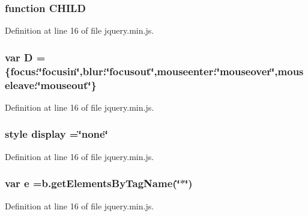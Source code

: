 \subsubsection[{C\-H\-I\-L\-D}]{\setlength{\rightskip}{0pt plus 5cm}function C\-H\-I\-L\-D}\label{jquery_8min_8js_a8f393b37f425a3fbb3a99911c237f50f}


Definition at line 16 of file jquery.\-min.\-js.

\subsubsection[{D}]{\setlength{\rightskip}{0pt plus 5cm}var D =\{focus\-:\char`\"{}focusin\char`\"{},blur\-:\char`\"{}focusout\char`\"{},mouseenter\-:\char`\"{}mouseover\char`\"{},mouseleave\-:\char`\"{}mouseout\char`\"{}\}}\label{jquery_8min_8js_ad741d7cd7e6eda75030b55e36b706c0a}


Definition at line 16 of file jquery.\-min.\-js.

\subsubsection[{display}]{ style display =\char`\"{}none\char`\"{}}\label{jquery_8min_8js_aa2eab1e65c94f564706044846d32a656}


Definition at line 16 of file jquery.\-min.\-js.

\subsubsection[{e}]{\setlength{\rightskip}{0pt plus 5cm}var e =b.\-get\-Elements\-By\-Tag\-Name(\char`\"{}$\ast$\char`\"{})}\label{jquery_8min_8js_ab5902775854a8b8440bcd25e0fe1c120}


Definition at line 16 of file jquery.\-min.\-js.

